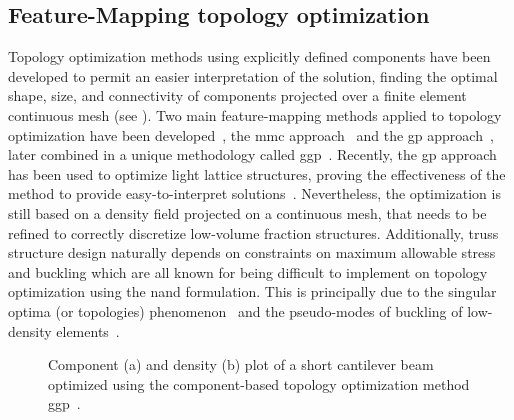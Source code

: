 \subsection{Feature-Mapping topology optimization}
Topology optimization methods using explicitly defined components have been developed to permit an easier interpretation of the solution, finding the optimal shape, size, and connectivity of components projected over a finite element continuous mesh (see ). Two main feature-mapping methods applied to topology optimization have been developed~, the \gls{mmc} approach~
and the \gls{gp} approach~, later combined in a unique methodology called \gls{ggp}~. Recently, the \gls{gp} approach has been used to optimize light lattice structures, proving the effectiveness of the method to provide easy-to-interpret solutions~. Nevertheless, the optimization is still based on a density field projected on a continuous mesh, that needs to be refined to correctly discretize low-volume fraction structures. Additionally, truss structure design naturally depends on constraints on maximum allowable stress and buckling which are all known for being difficult to implement on topology optimization using the \gls{nand} formulation. This is principally due to the singular optima (or topologies) phenomenon~ and the pseudo-modes of buckling of low-density elements~. \begin{figure}
    \hspace*{\fill}
    \hfill
    \hspace*{\fill}
    \caption{Component (a) and density (b) plot of a short cantilever beam optimized using the component-based topology optimization method \gls{ggp}~\cite{coniglio_generalized_2020}.}
    \label{fig:03_to_component}
\end{figure}


